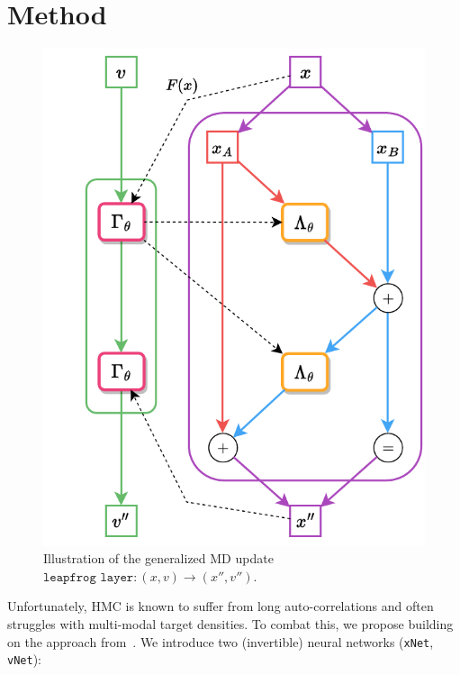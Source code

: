 \documentclass[a4paper,11pt]{article}
\begin{document}
\section{\label{sec:method}Method}
%
\begin{figure}
  \begin{center}
    \includegraphics[width=\linewidth]{assets/leapfrog-layer.drawio.pdf}
  \end{center}
  \caption{\label{fig:lf-layer}Illustration of the generalized MD update
  $\texttt{leapfrog layer}: (x, v) \rightarrow (x'', v'')$.}
\end{figure}
%
Unfortunately, HMC is known to suffer from long auto-correlations and often
struggles with multi-modal target densities.
%
To combat this, we propose building on the approach from~\cite{foreman_learning_2019,foreman_deep_2021,foreman_leapfroglayers_2022}. 
%
We introduce two (invertible) neural networks (\texttt{xNet}, \texttt{vNet}):
\end{document}
